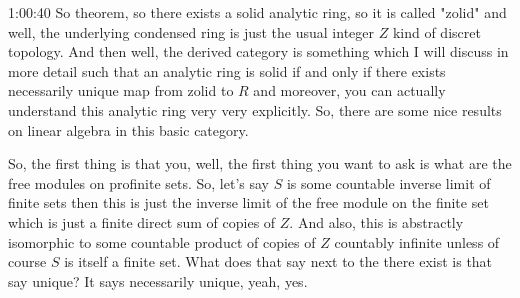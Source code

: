 \begin{unfinished}{1:00:40}
So theorem, so there exists a solid analytic ring, so it is called "zolid" and well, the underlying condensed ring is just the usual integer $Z$ kind of discret topology. And then well, the derived category is something which I will discuss in more detail such that an analytic ring is solid if and only if there exists necessarily unique map from zolid to $R$ and moreover, you can actually understand this analytic ring very very explicitly. So, there are some nice results on linear algebra in this basic category.

So, the first thing is that you, well, the first thing you want to ask is what are the free modules on profinite sets. So, let's say $S$ is some countable inverse limit of finite sets then this is just the inverse limit of the free module on the finite set which is just a finite direct sum of copies of $Z$. And also, this is abstractly isomorphic to some countable product of copies of $Z$ countably infinite unless of course $S$ is itself a finite set. What does that say next to the there exist is that say unique? It says necessarily unique, yeah, yes. 


\end{unfinished}
